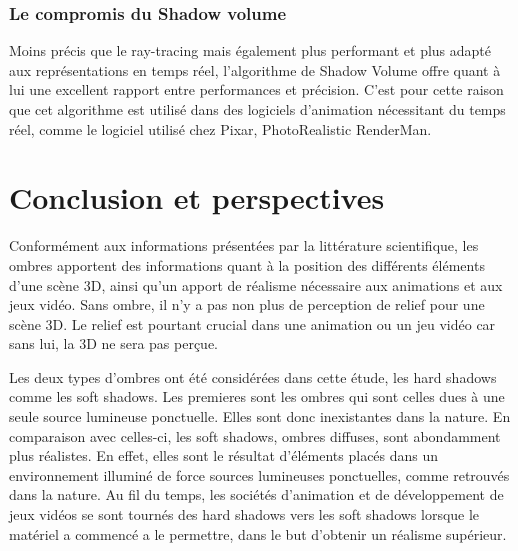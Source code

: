 \documentclass[a4paper,10pt]{report}
\begin{document}
\subsection{Le compromis du Shadow volume}

Moins précis que le ray-tracing mais également plus performant et plus adapté aux représentations en temps réel, l'algorithme de Shadow Volume offre quant à lui une excellent rapport entre performances et précision. C'est pour cette raison que cet algorithme est utilisé dans des logiciels d'animation nécessitant du temps réel, comme le logiciel utilisé chez Pixar, PhotoRealistic RenderMan.


\chapter{Conclusion et perspectives}

Conformément aux informations présentées par la littérature scientifique, les ombres apportent des informations quant à la position des différents éléments d'une scène 3D, ainsi qu'un apport de réalisme nécessaire aux animations et aux jeux vidéo. Sans ombre, il n'y a pas non plus de perception de relief pour une scène 3D. Le relief est pourtant crucial dans une animation ou un jeu vidéo car sans lui, la 3D ne sera pas perçue. 


Les deux types d'ombres ont été considérées dans cette étude, les hard shadows comme les soft shadows. Les premieres sont les ombres qui sont celles dues à une seule source lumineuse ponctuelle. Elles sont donc inexistantes dans la nature. En comparaison avec celles-ci, les soft shadows, ombres diffuses, sont abondamment plus réalistes. En effet, elles sont le résultat d'éléments placés dans un environnement illuminé de force sources lumineuses ponctuelles, comme retrouvés dans la nature.
Au fil du temps, les sociétés d'animation et de développement de jeux vidéos se sont tournés des hard shadows vers les soft shadows lorsque le matériel a commencé a le permettre, dans le but d'obtenir un réalisme supérieur.
\end{document}
